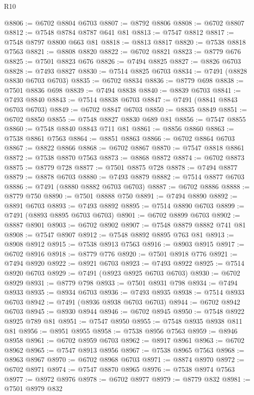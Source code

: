 \begin{lexlean}{R10}
\begin{coremodule}
@8806 := @6702 @8804 @6703
@8807 := @8792 @8806
@8808 := @6702 @8807
@8812 := @7548 @8784 @8787 @641 @81
@8813 := @7547 @8812
@8817 := @7548 @8797 @8800 @663 @81
@8818 := @8813 @8817
@8820 := @7538 @8818 @7563
@8821 := @8808 @8820
@8822 := @6702 @8821
@8823 := @8779 @676
@8825 := @7501 @8823 @676
@8826 := @7494 @8825
@8827 := @8826 @6703
@8828 := @7493 @8827
@8830 := @7514 @8825 @6703
@8834 := @7491 (@8828 @8830 @6703 @6703)
@8835 := @6702 @8834
@8836 := @8779 @698
@8838 := @7501 @8836 @698
@8839 := @7494 @8838
@8840 := @8839 @6703
@8841 := @7493 @8840
@8843 := @7514 @8838 @6703
@8847 := @7491 (@8841 @8843 @6703 @6703)
@8849 := @6702 @8847 @6703
@8850 := @8835 @8849
@8851 := @6702 @8850
@8855 := @7548 @8827 @8830 @689 @81
@8856 := @7547 @8855
@8860 := @7548 @8840 @8843 @711 @81
@8861 := @8856 @8860
@8863 := @7538 @8861 @7563
@8864 := @8851 @8863
@8866 := @6702 @8864 @6703
@8867 := @8822 @8866
@8868 := @6702 @8867
@8870 := @7547 @8818 @8861
@8872 := @7538 @8870 @7563
@8873 := @8868 @8872
@8874 := @6702 @8873
@8875 := @8779 @728
@8877 := @7501 @8875 @728
@8878 := @7494 @8877
@8879 := @8878 @6703
@8880 := @7493 @8879
@8882 := @7514 @8877 @6703
@8886 := @7491 (@8880 @8882 @6703 @6703)
@8887 := @6702 @8886
@8888 := @8779 @750
@8890 := @7501 @8888 @750
@8891 := @7494 @8890
@8892 := @8891 @6703
@8893 := @7493 @8892
@8895 := @7514 @8890 @6703
@8899 := @7491 (@8893 @8895 @6703 @6703)
@8901 := @6702 @8899 @6703
@8902 := @8887 @8901
@8903 := @6702 @8902
@8907 := @7548 @8879 @8882 @741 @81
@8908 := @7547 @8907
@8912 := @7548 @8892 @8895 @763 @81
@8913 := @8908 @8912
@8915 := @7538 @8913 @7563
@8916 := @8903 @8915
@8917 := @6702 @8916
@8918 := @8779 @776
@8920 := @7501 @8918 @776
@8921 := @7494 @8920
@8922 := @8921 @6703
@8923 := @7493 @8922
@8925 := @7514 @8920 @6703
@8929 := @7491 (@8923 @8925 @6703 @6703)
@8930 := @6702 @8929
@8931 := @8779 @798
@8933 := @7501 @8931 @798
@8934 := @7494 @8933
@8935 := @8934 @6703
@8936 := @7493 @8935
@8938 := @7514 @8933 @6703
@8942 := @7491 (@8936 @8938 @6703 @6703)
@8944 := @6702 @8942 @6703
@8945 := @8930 @8944
@8946 := @6702 @8945
@8950 := @7548 @8922 @8925 @789 @81
@8951 := @7547 @8950
@8955 := @7548 @8935 @8938 @811 @81
@8956 := @8951 @8955
@8958 := @7538 @8956 @7563
@8959 := @8946 @8958
@8961 := @6702 @8959 @6703
@8962 := @8917 @8961
@8963 := @6702 @8962
@8965 := @7547 @8913 @8956
@8967 := @7538 @8965 @7563
@8968 := @8963 @8967
@8970 := @6702 @8968 @6703
@8971 := @8874 @8970
@8972 := @6702 @8971
@8974 := @7547 @8870 @8965
@8976 := @7538 @8974 @7563
@8977 := @8972 @8976
@8978 := @6702 @8977
@8979 := @8779 @832
@8981 := @7501 @8979 @832

\end{coremodule}
\end{lexlean}
